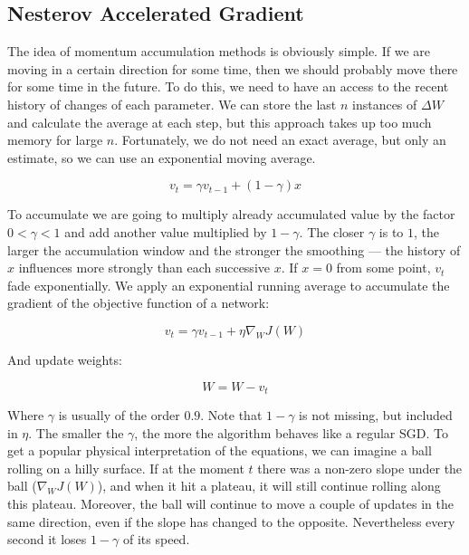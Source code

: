 \subsection{Nesterov Accelerated Gradient}

The idea of momentum accumulation methods is obviously simple. If we are moving in a certain direction for some time, then we should probably move there for some time in the future. To do this, we need to have an access to the recent history of changes of each parameter. We can store the last $n$ instances of $\Delta W$ and calculate the average at each step, but this approach takes up too much memory for large $n$. Fortunately, we do not need an exact average, but only an estimate, so we can use an exponential moving average.

\begin{equation}
    \label{eq:derivative-momentum-1}
    v_t = \gamma v_{t-1} + (1-\gamma) x
\end{equation}

To accumulate we are going to multiply already accumulated value by the factor $0 < \gamma < 1$ and add another value multiplied by $1-\gamma$. The closer $\gamma$ is to $1$, the larger the accumulation window and the stronger the smoothing — the history of $x$ influences more strongly than each successive $x$. If $x=0$ from some point, $v_t$ fade exponentially. We apply an exponential running average to accumulate the gradient of the objective function of a network:

\begin{equation}
    v_t = \gamma v_{t-1} + \eta \nabla_W J(W)
\end{equation}

And update weights:

\begin{equation}
    W = W - v_t
\end{equation}

Where $\gamma$ is usually of the order $0.9$. Note that $1-\gamma$ is not missing, but included in $\eta$. The smaller the $\gamma$, the more the algorithm behaves like a regular SGD. To get a popular physical interpretation of the equations, we can imagine a ball rolling on a hilly surface. If at the moment $t$ there was a non-zero slope under the ball ($\nabla_W J(W)$), and when it hit a plateau, it will still continue rolling along this plateau. Moreover, the ball will continue to move a couple of updates in the same direction, even if the slope has changed to the opposite. Nevertheless every second it loses $1-\gamma$ of its speed.


